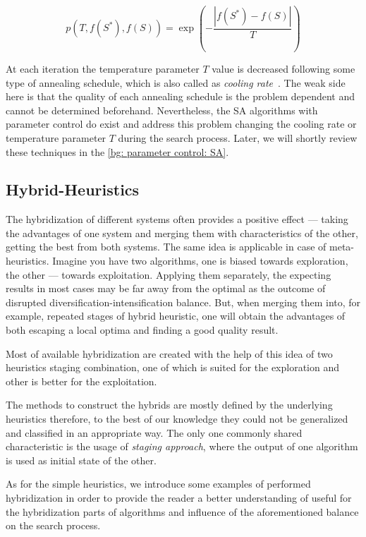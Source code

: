 \begin{equation}
p(T, f(S^*), f(S)) = \exp(-\frac{|f(S^*) - f(S)|}{T})
\label{bg: SA acceptance criteria}
\end{equation}

At each iteration the temperature parameter $T$ value is decreased following some type of annealing schedule, which is also called as \textit{cooling rate}~\cite{boussaid2013survey}. The weak side here is that the quality of each annealing schedule is the problem dependent and cannot be determined beforehand. Nevertheless, the SA algorithms with parameter control do exist and address this problem changing the cooling rate or temperature parameter $T$ during the search process. Later, we will shortly review these techniques in the \cref{bg: parameter control: SA}.


\subsection{Hybrid-Heuristics}
The hybridization of different systems often provides a positive effect — taking the advantages of one system and merging them with characteristics of the other, getting the best from both systems. The same idea is applicable in case of meta-heuristics. Imagine you have two algorithms, one is biased towards exploration, the other — towards exploitation. Applying them separately, the expecting results in most cases may be far away from the optimal as the outcome of disrupted diversification-intensification balance. But, when merging them into, for example, repeated stages of hybrid heuristic, one will obtain the advantages of both escaping a local optima and finding a good quality result. 

Most of available hybridization are created with the help of this idea of two heuristics staging combination, one of which is suited for the exploration and other is better for the exploitation.

The methods to construct the hybrids are mostly defined by the underlying heuristics therefore, to the best of our knowledge they could not be generalized and classified in an appropriate way. The only one commonly shared characteristic is the usage of \textit{staging approach}, where the output of one algorithm is used as initial state of the other. 

As for the simple heuristics, we introduce some examples of performed hybridization in order to provide the reader a better understanding of useful for the hybridization parts of algorithms and influence of the aforementioned balance on the search process.

